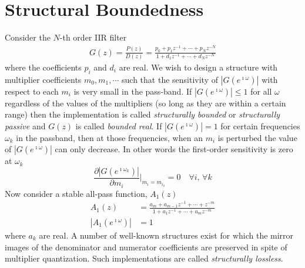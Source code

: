 \documentclass[a4paper,twoside,10pt,english]{report}
\begin{document}
\section{Structural Boundedness}
Consider the $N$-th order IIR filter
\begin{align*}
G\left(z\right)=\frac{P\left(z\right)}{D\left(z\right)}=\frac{p_{0}+p_{1}z^{-1}+\cdots+p_{N}z^{-N}}{1+d_{1}z^{-1}+\cdots+d_{N}z^{-N}}
\end{align*}
where the coefficients $p_{i}$ and $d_{i}$ are real. We wish to
design a structure with multiplier coefficients $m_{0},m_{1},\cdots$
such that the sensitivity of $\left|G\left(e^{\imath\omega}\right)\right|$
with respect to each $m_{i}$ is very small in the pass-band. If $\left|G\left(e^{\imath\omega}\right)\right|\leq1$
for all $\omega$ regardless of the values of the multipliers (so
long as they are within a certain range) then the implementation is
called \emph{structurally bounded} or \emph{structurally passive}
and $G\left(z\right)$ is called \emph{bounded real}. If $\left|G\left(e^{\imath\omega}\right)\right|=1$
for certain frequencies $\omega_{k}$ in the passband, then at those
frequencies, when an $m_{i}$ is perturbed the value of 
$\left| G \left(e^{\imath\omega}\right)\right|$
can only decrease. In other words the first-order sensitivity is zero at 
$\omega_{k}$
\begin{equation*}
\frac{\partial \left|G\left(e^{\imath\omega_{k}}\right)\right|}{\partial m_{i}} 
\Bigg|_{m_{i}=m_{i_{0}}} = 0 \quad \forall i, \, \forall k
\end{equation*}
Now consider a stable all-pass function, $A_{1}\left(z\right)$
\begin{align*}
A_{1}\left(z\right) &=  
\frac{a_{m}+a_{m-1}z^{-1}+\cdots+z^{-m}}{1+a_{1}z^{-1}+\cdots+a_{m}z^{-m}}\\
\left|A_{1}\left(e^{\imath\omega}\right)\right| &= 1
\end{align*}
where $a_{k}$ are real. A number of well-known structures exist for
which the mirror images of the denominator and numerator coefficients
are preserved in spite of multiplier quantization. Such implementations
are called \emph{structurally lossless}. 
\end{document}
